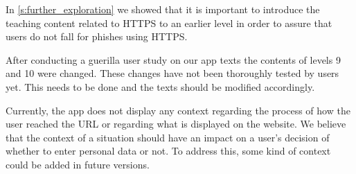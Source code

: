 \begin{description}[leftmargin=0cm]
	\item[Introduce HTTPS Earlier:] In \autoref{s:further_exploration} we showed that it is important to introduce the teaching content related to HTTPS to an earlier level in order to assure that users do not fall for phishes using HTTPS.
	\item[Text Improvements:] After conducting a guerilla user study on our app texts the contents of levels 9 and 10 were changed. These changes have not been thoroughly tested by users yet.  This needs to be done and the texts should be modified accordingly. 
	\item[Add context:] Currently, the app does not display any context regarding the process of how the user reached the URL or regarding what is displayed on the website. We believe that the context of a situation should have an impact on a user's decision of whether to enter personal data or not. To address this, some kind of context could be added in future versions.
\end{description}

